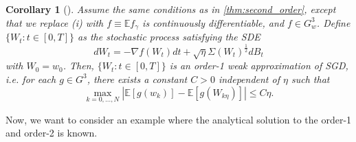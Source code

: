 \documentclass[12pt]{article}
\newtheorem{corollary}[theorem]{Corollary}
\theoremstyle{definition}
\numberwithin{equation}{section}
\newcommand{\E}{\mathbb{E}}
\newcommand{\ev}[1]{\mathbb{E}\left[{#1}\right]}
\begin{document}
\begin{corollary}[]
  \label{cor:first_order}
  Assume the same conditions as in \autoref{thm:second_order}, except that we replace (i) with $f \equiv \E f_{\gamma}$ is continuously differentiable, and $f \in G^3_w$.
  Define $\{W_t:t\in [0,T] \}$ as the stochastic process satisfying the SDE
  \begin{equation}
    \label{eq:first_order_sde}
    d W_t = -\nabla f(W_t) dt + \sqrt{\eta}\Sigma(W_t)^{\frac{1}{2}}dB_t
  \end{equation}
  with $W_0 = w_0$. Then, $\{W_t:t\in [0,T] \}$ is an order-1 weak approximation of SGD, i.e. for each $g \in G^3$, there exists a constant $C > 0$ independent of $\eta$ such that
  \begin{equation}
    \max_{k=0,\dots,N} |\ev{g(w_k)} - \ev{g(W_{k\eta})}| \leq C \eta.
  \end{equation}
\end{corollary}
Now, we want to consider an example where the analytical solution to the order-1 and order-2 is known.
\end{document}
